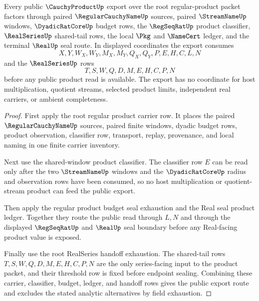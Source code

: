 \begin{theorem}
\label{thm:cauchyproduct-root-regular-product-public-export}
Every public $\CauchyProductUp$ export over the root regular-product packet factors through paired $\RegularCauchyNameUp$ sources, paired $\StreamNameUp$ windows, $\DyadicRatCoreUp$ budget rows, the $\RegSeqRatUp$ product classifier, $\RealSeriesUp$ shared-tail rows, the local $\Pkg$ and $\NameCert$ ledger, and the terminal $\RealUp$ seal route. In displayed coordinates the export consumes
$$
X,Y,W_X,W_Y,M_X,M_Y,Q_X,Q_Y,P,E,H,C,L,N
$$
and the $\RealSeriesUp$ rows
$$
T,S,W,Q,D,M,E,H,C,P,N
$$
before any public product read is available. The export has no coordinate for host multiplication, quotient streams, selected product limits, independent real carriers, or ambient completeness.
\end{theorem}
\begin{proof}
First apply the root regular product carrier row. It places the paired $\RegularCauchyNameUp$ sources, paired finite windows, dyadic budget rows, product observation, classifier row, transport, replay, provenance, and local naming in one finite carrier inventory.

Next use the shared-window product classifier. The classifier row $E$ can be read only after the two $\StreamNameUp$ windows and the $\DyadicRatCoreUp$ radius and observation rows have been consumed, so no host multiplication or quotient-stream product can feed the public export.

Then apply the regular product budget seal exhaustion and the Real seal product ledger. Together they route the public read through $L,N$ and through the displayed $\RegSeqRatUp$ and $\RealUp$ seal boundary before any Real-facing product value is exposed.

Finally use the root RealSeries handoff exhaustion. The shared-tail rows $T,S,W,Q,D,M,E,H,C,P,N$ are the only series-facing input to the product packet, and their threshold row is fixed before endpoint sealing. Combining these carrier, classifier, budget, ledger, and handoff rows gives the public export route and excludes the stated analytic alternatives by field exhaustion.
\end{proof}

